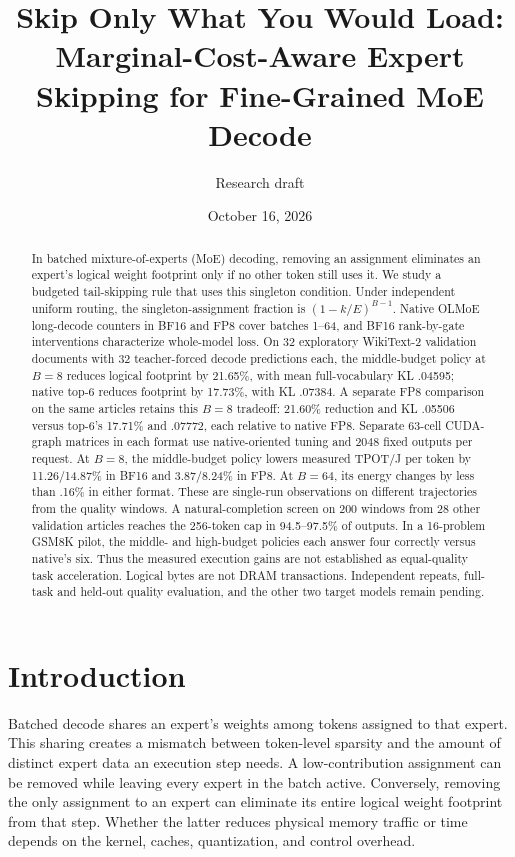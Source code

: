\documentclass[10pt,twocolumn]{article}
\title{Skip Only What You Would Load:\\Marginal-Cost-Aware Expert Skipping for Fine-Grained MoE Decode}
\author{Research draft}
\date{October 16, 2026}
\begin{document}
\maketitle
\begin{abstract}
In batched mixture-of-experts (MoE) decoding, removing an assignment eliminates an expert's logical weight footprint only if no other token still uses it. We study a budgeted tail-skipping rule that uses this singleton condition. Under independent uniform routing, the singleton-assignment fraction is $(1-k/E)^{B-1}$. Native OLMoE long-decode counters in BF16 and FP8 cover batches 1--64, and BF16 rank-by-gate interventions characterize whole-model loss. On 32 exploratory WikiText-2 validation documents with 32 teacher-forced decode predictions each, the middle-budget policy at $B=8$ reduces logical footprint by 21.65\%, with mean full-vocabulary KL .04595; native top-6 reduces footprint by 17.73\%, with KL .07384. A separate FP8 comparison on the same articles retains this $B=8$ tradeoff: 21.60\% reduction and KL .05506 versus top-6's 17.71\% and .07772, each relative to native FP8. Separate 63-cell CUDA-graph matrices in each format use native-oriented tuning and 2048 fixed outputs per request. At $B=8$, the middle-budget policy lowers measured TPOT/J per token by 11.26/14.87\% in BF16 and 3.87/8.24\% in FP8. At $B=64$, its energy changes by less than .16\% in either format. These are single-run observations on different trajectories from the quality windows. A natural-completion screen on 200 windows from 28 other validation articles reaches the 256-token cap in 94.5--97.5\% of outputs. In a 16-problem GSM8K pilot, the middle- and high-budget policies each answer four correctly versus native's six. Thus the measured execution gains are not established as equal-quality task acceleration. Logical bytes are not DRAM transactions. Independent repeats, full-task and held-out quality evaluation, and the other two target models remain pending.
\end{abstract}

\section{Introduction}
Batched decode shares an expert's weights among tokens assigned to that expert. This sharing creates a mismatch between token-level sparsity and the amount of distinct expert data an execution step needs. A low-contribution assignment can be removed while leaving every expert in the batch active. Conversely, removing the only assignment to an expert can eliminate its entire logical weight footprint from that step. Whether the latter reduces physical memory traffic or time depends on the kernel, caches, quantization, and control overhead.
\end{document}
